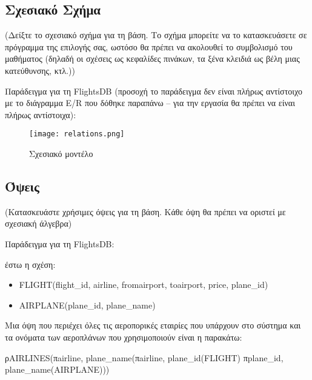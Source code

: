 \subsection{Σχεσιακό Σχήμα}

(Δείξτε το σχεσιακό σχήμα για τη βάση. Το σχήμα μπορείτε να το
κατασκευάσετε σε πρόγραμμα της επιλογής σας, ωστόσο θα πρέπει να
ακολουθεί το συμβολισμό του μαθήματος (δηλαδή οι σχέσεις ως κεφαλίδες
πινάκων, τα ξένα κλειδιά ως βέλη μιας κατεύθυνσης, κτλ.))

Παράδειγμα για τη FlightsDB (προσοχή το παράδειγμα δεν είναι πλήρως
αντίστοιχο με το διάγραμμα E/R που δόθηκε παραπάνω – για την εργασία
θα πρέπει να είναι πλήρως αντίστοιχα):

\begin{figure}[H]
  \centering
  \texttt{[image: relations.png]}
  \caption{Σχεσιακό μοντέλο}
\end{figure}

\subsection{Όψεις}
(Κατασκευάστε χρήσιμες όψεις για τη βάση. Κάθε όψη θα πρέπει να
οριστεί με σχεσιακή άλγεβρα)

Παράδειγμα για τη FlightsDB:

έστω η σχέση:

\begin{itemize}[noitemsep]
\item FLIGHT(flight\_id, airline, fromairport, toairport, price,
  plane\_id)
\item AIRPLANE(plane\_id, plane\_name) 
\end{itemize}

Μια όψη που περιέχει όλες τις αεροπορικές εταιρίες που υπάρχουν στο
σύστημα και τα ονόματα των αεροπλάνων που χρησιμοποιούν είναι η
παρακάτω:

ρAIRLINES(πairline, plane\_name(πairline, plane\_id(FLIGHT)
πplane\_id, plane\_name(AIRPLANE)))



